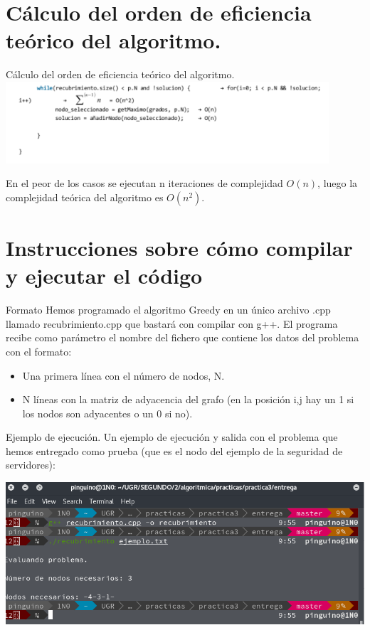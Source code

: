 \documentclass[10pt]{beamer}
\begin{document}
\section{Cálculo del orden de eficiencia teórico del algoritmo.}
\begin{frame}{Cálculo del orden de eficiencia teórico del algoritmo.}{}  
\includegraphics[width=0.9\textwidth]{eficienciaGreedy.pdf}

En el peor de los casos se ejecutan n iteraciones de complejidad $O(n)$, luego la complejidad teórica del algoritmo es $O(n^2)$.
\end{frame}



\section{Instrucciones sobre cómo compilar y ejecutar el código}
\begin{frame}{Formato}{}  
	Hemos programado el algoritmo Greedy en un único archivo .cpp llamado recubrimiento.cpp que bastará con compilar con g++.
	El programa recibe como parámetro el nombre del fichero que contiene los datos del problema con el formato:
	\begin{itemize}
		\item Una primera línea con el número de nodos, N.
		\item N líneas con la matriz de adyacencia del grafo (en la posición i,j hay un 1 si los nodos son adyacentes o un 0 si no).
	\end{itemize}

\end{frame}


\begin{frame}{Ejemplo de ejecución.}{}
	Un ejemplo de ejecución y salida con el problema que hemos entregado como prueba (que es el nodo del ejemplo de la seguridad de servidores):
	
	
	\includegraphics[width=\textwidth]{pantallazo.png}
	
	
\end{frame}

{\aauwavesbg%
\begin{frame}%
\end{frame}}
\end{document}

